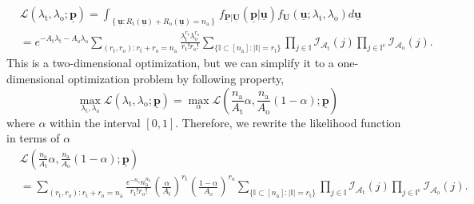\begin{equation} \label{equation:Likelihood}
\begin{split}
& \mathcal{L} \left( \lambda_{\mathrm{t}}, \lambda_{\mathrm{o}};
\underline{\mathbf{p}} \right)
= \int_{ \left\{ \underline{\mathbf{u}}
	: R_{\mathrm{t}}(\underline{\mathbf{u}}) +
	R_{\mathrm{o}}(\underline{\mathbf{u}}) = n_{\mathrm{a}} \right\} }
f_{\underline{\mathbf{P}} | \underline{\mathbf{U}}}
\left( \underline{\mathbf{p}} | \underline{\mathbf{u}} \right)
f_{\underline{\mathbf{U}}} \left( \underline{\mathbf{u}};
\lambda_{\mathrm{t}}, \lambda_{\mathrm{o}} \right) d\underline{\mathbf{u}} \\
&= e^{- A_{\mathrm{t}} \lambda_{\mathrm{t}}
	- A_{\mathrm{o}} \lambda_{\mathrm{o}}}
\sum_{(r_{\mathrm{t}}, r_{\mathrm{o}}) :
	r_{\mathrm{t}} + r_{\mathrm{o}} = n_{\mathrm{a}}}
\frac{\lambda_{\mathrm{t}}^{r_{\mathrm{t}}}
	\lambda_{\mathrm{o}}^{r_{\mathrm{o}}}}
{r_{\mathrm{t}}! r_{\mathrm{o}}!}
\sum_{\{ \mathbb{I} \subset [n_{\mathrm{a}}]
	: |\mathbb{I}| = r_{\mathrm{t}} \}}
\prod_{j \in \mathbb{I}}
\mathcal{I}_{\mathcal{A}_{\mathrm{t}}}(j)
\prod_{j \in \mathbb{I}^{\mathrm{c}}}
\mathcal{I}_{\mathcal{A}_{\mathrm{o}}}(j) .
\end{split}
\end{equation}
This is a two-dimensional optimization, but we can simplify it to a one-dimensional optimization problem by following property,
\begin{equation} 
\max_{\lambda_{\mathrm{t}}, \lambda_{\mathrm{o}}}
\mathcal{L} \left( \lambda_{\mathrm{t}}, \lambda_{\mathrm{o}};
\underline{\mathbf{p}} \right)
= \max_{\alpha} \mathcal{L} \left(
\frac{n_{\mathrm{a}}}{A_{\mathrm{t}}} \alpha ,
\frac{n_{\mathrm{a}}}{A_{\mathrm{o}}} (1 - \alpha) ;
\underline{\mathbf{p}} \right)
\end{equation}
where $\alpha$ within the interval $[0, 1]$.
Therefore, we rewrite the likelihood function in terms of $\alpha$
\begin{equation}
\begin{split}
&\mathcal{L} \left(
\frac{n_{\mathrm{a}}}{A_{\mathrm{t}}} \alpha ,
\frac{n_{\mathrm{a}}}{A_{\mathrm{o}}} (1 - \alpha) ;
\underline{\mathbf{p}} \right) \\
&= \sum_{(r_{\mathrm{t}}, r_{\mathrm{o}}) :
	r_{\mathrm{t}} + r_{\mathrm{o}} = n_{\mathrm{a}}}
\frac{e^{- n_{\mathrm{a}}} n_{\mathrm{a}}^{n_{\mathrm{a}}}}
{r_{\mathrm{t}}! r_{\mathrm{o}}!}
\left( \frac{\alpha}{A_{\mathrm{t}}} \right)^{r_{\mathrm{t}}}
\left( \frac{1 - \alpha}{A_{\mathrm{o}}} \right)^{r_{\mathrm{o}}}
\sum_{\{ \mathbb{I} \subset [n_{\mathrm{a}}] : |\mathbb{I}| = r_{\mathrm{t}} \}}
\prod_{j \in \mathbb{I}} \mathcal{I}_{\mathcal{A}_{\mathrm{t}}}(j)
\prod_{j \in \mathbb{I}^{\mathrm{c}}}
\mathcal{I}_{\mathcal{A}_{\mathrm{o}}}(j) .
\end{split}
\end{equation}
